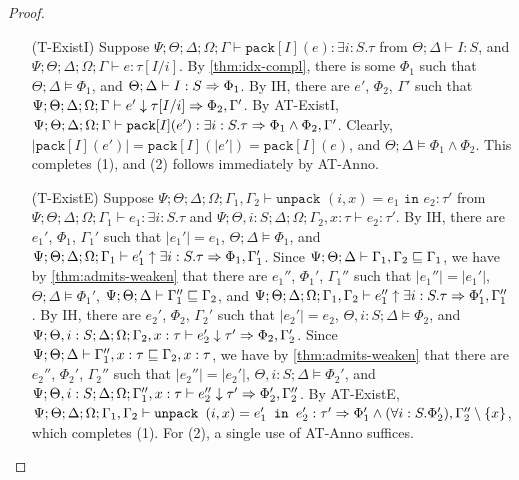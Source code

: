 \begin{proof}
\begin{itemize}
  \item[(T-ExistI)] Suppose $\Psi ; \Theta ; \Delta ; \Omega ; \Gamma\vdash \texttt{pack}[I](e) : \exists i:S.\tau$ from
  $\Theta ; \Delta \vdash I : S$, and
  $\Psi ; \Theta ; \Delta ; \Omega ; \Gamma\vdash e : \tau[I/i]$.
  By \autoref{thm:idx-compl}, there is some $\Phi_1$ such that
  $\Theta ; \Delta \vDash \Phi_1$, and
  $\Theta ; \Delta \vdash I : S \Rightarrow \Phi_1$.
  By IH, there are $e'$, $\Phi_2$, $\Gamma'$ such that
  $\Psi ; \Theta ; \Delta ; \Omega ; \Gamma \vdash e' \downarrow \tau[I/i] \Rightarrow \Phi_2,\Gamma'$.
  By AT-ExistI,
  $\Psi ; \Theta ; \Delta ; \Omega ; \Gamma\vdash \texttt{pack}[I](e') : \exists i:S.\tau \Rightarrow \Phi_1 \wedge \Phi_2,\Gamma'$.
  Clearly, $|\texttt{pack}[I](e')| = \texttt{pack}[I](|e'|) = \texttt{pack}[I](e)$, and $\Theta ; \Delta \vDash \Phi_1 \wedge \Phi_2$.
  This completes (1), and (2) follows immediately by AT-Anno.
  
  \item[(T-ExistE)] Suppose
  $\Psi ; \Theta ; \Delta ; \Omega ; \Gamma_1,\Gamma_2\vdash \texttt{unpack } (i,x) = e_1 \texttt{ in } e_2 : \tau'$ from
  $\Psi ; \Theta ; \Delta ; \Omega ; \Gamma_1\vdash e_1 : \exists i : S.\tau$ and
  $\Psi ; \Theta, i : S ; \Delta ; \Omega ; \Gamma_2, x : \tau \vdash e_2 : \tau'$.
  By IH, there are $e_1'$, $\Phi_1$, $\Gamma_1'$ such that
  $|e_1'| = e_1$,
  $\Theta ; \Delta \vDash \Phi_1$, and
  $\Psi ; \Theta ; \Delta ; \Omega ; \Gamma_1 \vdash e_1' \uparrow \exists i : S. \tau \Rightarrow \Phi_1,\Gamma_1'$.
  Since $\Psi ; \Theta ; \Delta \vdash \Gamma_1,\Gamma_2 \sqsubseteq \Gamma_1$,
  we have by \autoref{thm:admits-weaken} that there are $e_1''$, $\Phi_1'$, $\Gamma_1''$ such that
  $|e_1''| = |e_1'|$,
  $\Theta ; \Delta \vDash \Phi_1'$,
  $\Psi ; \Theta ; \Delta \vdash \Gamma_1'' \sqsubseteq \Gamma_2$, and
  $\Psi ; \Theta ; \Delta ; \Omega ; \Gamma_1,\Gamma_2 \vdash e_1'' \uparrow \exists i : S. \tau \Rightarrow \Phi_1',\Gamma_1''$.
  By IH, there are $e_2'$, $\Phi_2$, $\Gamma_2'$ such that
  $|e_2'| = e_2$,
  $\Theta, i : S ; \Delta \vDash \Phi_2$, and
  $\Psi ; \Theta, i : S ; \Delta ; \Omega ; \Gamma_2,x : \tau \vdash e_2' \downarrow \tau' \Rightarrow \Phi_2,\Gamma_2'$.
  Since $\Psi ; \Theta ; \Delta \vdash \Gamma_1'',x : \tau \sqsubseteq \Gamma_2, x : \tau$,
  we have by \autoref{thm:admits-weaken} that there are $e_2''$, $\Phi_2'$, $\Gamma_2''$ such that
  $|e_2''| = |e_2'|$,
  $\Theta, i : S ; \Delta \vDash \Phi_2'$, and
  $\Psi ; \Theta, i : S ; \Delta ; \Omega ; \Gamma_1'', x: \tau \vdash e_2'' \downarrow \tau' \Rightarrow \Phi_2',\Gamma_2''$.
  By AT-ExistE,
  $\Psi ; \Theta ; \Delta ; \Omega ; \Gamma_1,\Gamma_2\vdash \texttt{unpack } (i,x) = e_1' \texttt{ in } e_2' : \tau' \Rightarrow \Phi_1' \wedge (\forall i : S. \Phi_2'),\Gamma_2'' \setminus \{x\}$,
  which completes (1). For (2), a single use of AT-Anno suffices.
  

\end{itemize}
\end{proof}

